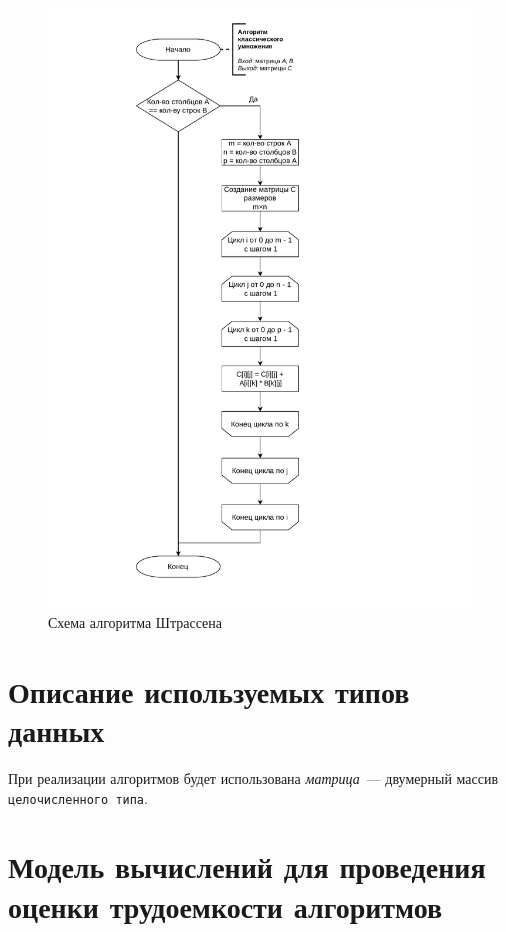 \begin{figure}[h]
	\centering
	\includegraphics[height=0.9\textheight, page=6]{algo-scheme.pdf}
	\caption{Схема алгоритма Штрассена}
	\label{fig:strass}
\end{figure}

\clearpage


\section{Описание используемых типов данных}

При реализации алгоритмов будет использована \textit{матрица}~--- двумерный массив \texttt{целочисленного типа}.

\section{Модель вычислений для проведения оценки трудоемкости алгоритмов}

